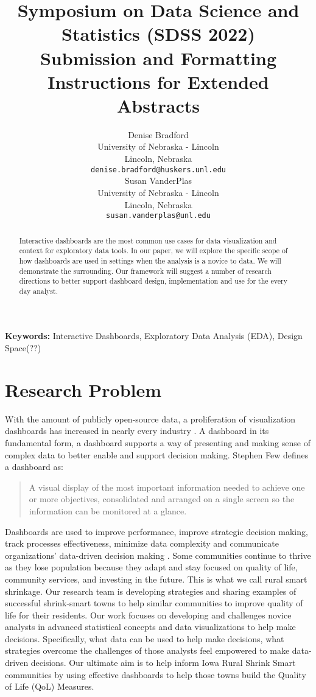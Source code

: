 \documentclass[10pt]{article}
\title{Symposium on Data Science and Statistics (SDSS 2022) \\
Submission and Formatting Instructions for Extended Abstracts}
\author{
  Denise Bradford \\
  University of Nebraska - Lincoln \\
  Lincoln, Nebraska \\
  {\tt denise.bradford@huskers.unl.edu} \\\And
  Susan VanderPlas \\
  University of Nebraska - Lincoln \\
  Lincoln, Nebraska \\
  {\tt susan.vanderplas@unl.edu} \\}
\date{}
\begin{document}


\maketitle
\begin{abstract}
Interactive dashboards are the most common use cases for data visualization and context for exploratory data tools. In our paper, we will explore the specific scope of how dashboards are used in settings when the analysis is a novice to data. We will demonstrate the surrounding. Our framework will suggest a number of research directions to better support dashboard design, implementation and use for the every day analyst. 
\end{abstract}

{\bf Keywords:} Interactive Dashboards, Exploratory Data Analysis (EDA), Design Space(??)

\section{Research Problem}
With the amount of publicly open-source data, a proliferation of visualization dashboards has increased in nearly every industry \cite{Fisher}. A dashboard in its fundamental form, a dashboard supports a way of presenting and making sense of complex data to better enable and support decision making. Stephen Few defines a dashboard as:
\begin{quotation}
\small A visual display of the most important information needed to achieve one or more objectives, consolidated and arranged on a single screen so the information can be monitored at a glance. \cite{Few}
\end{quotation}
Dashboards are used to improve performance, improve strategic decision making, track processes effectiveness, minimize data complexity and communicate organizations' data-driven decision making \cite{...}.
Some communities continue to thrive as they lose population because they adapt and stay focused on quality of life, community services, and investing in the future. This is what we call rural smart shrinkage. Our research team is developing strategies and sharing examples of successful shrink-smart towns to help similar communities to improve quality of life for their residents\cite{SCC}. Our work focuses on developing and challenges novice analysts in advanced statistical concepts and data visualizations to help make decisions. Specifically, what data can be used to help make decisions, what strategies overcome the challenges of those analysts feel empowered to make data-driven decisions. Our ultimate aim is to help inform Iowa Rural Shrink Smart communities by using effective dashboards to help those towns build the Quality of Life (QoL) Measures.
\end{document}
